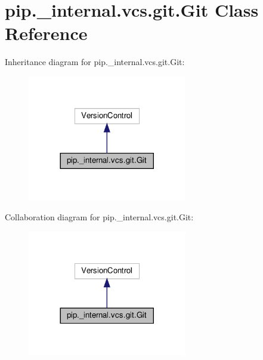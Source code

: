 \hypertarget{classpip_1_1__internal_1_1vcs_1_1git_1_1Git}{}\section{pip.\+\_\+internal.\+vcs.\+git.\+Git Class Reference}
\label{classpip_1_1__internal_1_1vcs_1_1git_1_1Git}


Inheritance diagram for pip.\+\_\+internal.\+vcs.\+git.\+Git\+:
\nopagebreak
\begin{figure}[H]
\begin{center}
\leavevmode
\includegraphics[width=197pt]{classpip_1_1__internal_1_1vcs_1_1git_1_1Git__inherit__graph}
\end{center}
\end{figure}


Collaboration diagram for pip.\+\_\+internal.\+vcs.\+git.\+Git\+:
\nopagebreak
\begin{figure}[H]
\begin{center}
\leavevmode
\includegraphics[width=197pt]{classpip_1_1__internal_1_1vcs_1_1git_1_1Git__coll__graph}
\end{center}
\end{figure}
